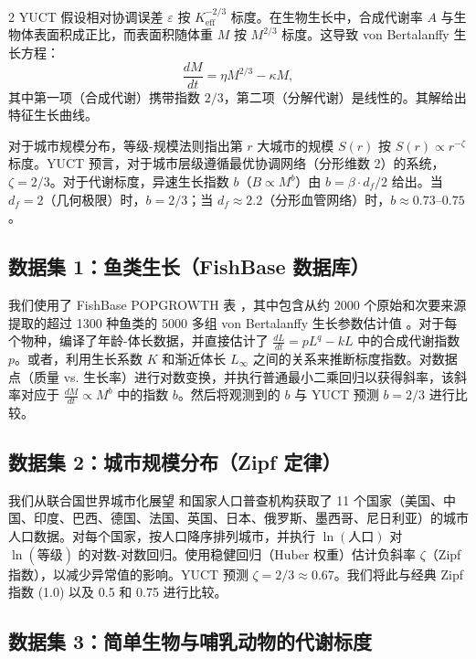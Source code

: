 \documentclass[11pt,a4paper]{article}
\newcommand{\eps}{\varepsilon}
\newcommand{\Keff}{K_{\mathrm{eff}}}
\newcommand{\betaf}{\beta}
\newcommand{\df}{d_f}
\begin{document}
\begin{multicols}{2}
		YUCT 假设相对协调误差 \(\eps\) 按 \(\Keff^{-2/3}\) 标度。在生物生长中，合成代谢率 \(A\) 与生物体表面积成正比，而表面积随体重 \(M\) 按 \(M^{2/3}\) 标度。这导致 von Bertalanffy 生长方程：
		\[
		\frac{dM}{dt} = \eta M^{2/3} - \kappa M,
		\]
		其中第一项（合成代谢）携带指数 \(2/3\)，第二项（分解代谢）是线性的。其解给出特征生长曲线。
		
		对于城市规模分布，等级-规模法则指出第 \(r\) 大城市的规模 \(S(r)\) 按 \(S(r) \propto r^{-\zeta}\) 标度。YUCT 预言，对于城市层级遵循最优协调网络（分形维数 2）的系统，\(\zeta = 2/3\)。对于代谢标度，异速生长指数 \(b\)（\(B \propto M^{b}\)）由 \(b = \betaf \cdot \df / 2\) 给出。当 \(\df = 2\)（几何极限）时，\(b = 2/3\)；当 \(\df \approx 2.2\)（分形血管网络）时，\(b \approx 0.73\)–\(0.75\)。
		
		\subsection{数据集 1：鱼类生长（FishBase 数据库）}
		
		我们使用了 FishBase POPGROWTH 表 \cite{FishBase}，其中包含从约 2000 个原始和次要来源提取的超过 1300 种鱼类的 5000 多组 von Bertalanffy 生长参数估计值 \cite{Pauly1998}。对于每个物种，编译了年龄-体长数据，并直接估计了 \(\frac{dL}{dt} = p L^{q} - k L\) 中的合成代谢指数 \(p\)。或者，利用生长系数 \(K\) 和渐近体长 \(L_\infty\) 之间的关系来推断标度指数。对数据点（质量 vs. 生长率）进行对数变换，并执行普通最小二乘回归以获得斜率，该斜率对应于 \(\frac{dM}{dt} \propto M^{b}\) 中的指数 \(b\)。然后将观测到的 \(b\) 与 YUCT 预测 \(b = 2/3\) 进行比较。
		
		\subsection{数据集 2：城市规模分布（Zipf 定律）}
		
		我们从联合国世界城市化展望 \cite{UN2018} 和国家人口普查机构获取了 11 个国家（美国、中国、印度、巴西、德国、法国、英国、日本、俄罗斯、墨西哥、尼日利亚）的城市人口数据。对每个国家，按人口降序排列城市，并执行 \(\ln(\text{人口})\) 对 \(\ln(\text{等级})\) 的对数-对数回归。使用稳健回归（Huber 权重）估计负斜率 \(\zeta\)（Zipf 指数），以减少异常值的影响。YUCT 预测 \(\zeta = 2/3 \approx 0.67\)。我们将此与经典 Zipf 指数 (1.0) 以及 0.5 和 0.75 进行比较。
		
		\subsection{数据集 3：简单生物与哺乳动物的代谢标度}
		

\end{multicols}
\end{document}
